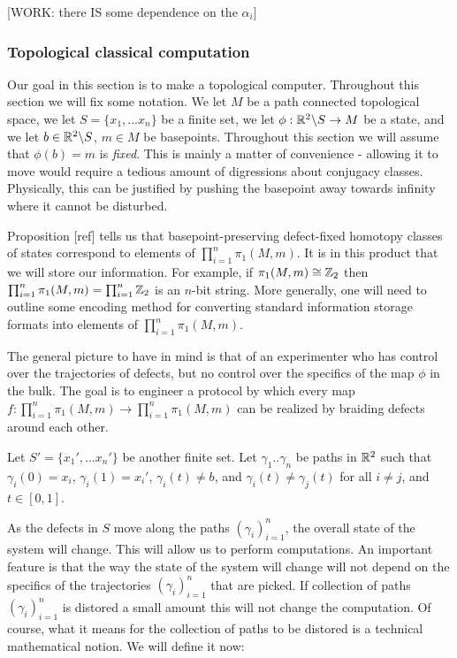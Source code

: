 \documentclass{article}
\theoremstyle{definition}
\numberwithin{figure}{section}
\begin{document}
[WORK: there IS some dependence on the $\alpha_i$]

\subsubsection{Topological classical computation}

Our goal in this section is to make a topological computer. Throughout this section we will fix some notation. We let $M$ be a path connected topological space, we let $S=\{x_1, ...x_n\}$ be a finite set, we let $\phi:\mathbb{R}^2\backslash S\to M$ be a state, and we let $b\in \mathbb{R}^2\backslash S$, $m\in M$ be basepoints. Throughout this section we will assume that $\phi(b)=m$ is \textit{fixed}. This is mainly a matter of convenience - allowing it to move would require a tedious amount of digressions about conjugacy classes. Physically, this can be justified by pushing the basepoint away towards infinity where it cannot be disturbed.

Proposition [ref] tells us that basepoint-preserving defect-fixed homotopy classes of states correspond to elements of $\prod_{i=1}^n\pi_1(M,m)$. It is in this product that we will store our information. For example, if $\pi_1(M,m)\cong \mathbb{Z}_2$ then $\prod_{i=1}^n\pi_1(M,m)=\prod_{i=1}^n\mathbb{Z}_2$ is an $n$-bit string. More generally, one will need to outline some encoding method for converting standard information storage formats into elements of $\prod_{i=1}^n\pi_1(M,m)$.

The general picture to have in mind is that of an experimenter who has control over the trajectories of defects, but no control over the specifics of the map $\phi$ in the bulk. The goal is to engineer a protocol by which every map $f:\prod_{i=1}^n\pi_1(M,m)\to\prod_{i=1}^n\pi_1(M,m)$ can be realized by braiding defects around each other.

Let $S'=\{x_1', ...x_n'\}$ be another finite set. Let $\gamma_1..\gamma_n$ be paths in $\mathbb{R}^2$ such that $\gamma_i(0)=x_i$, $\gamma_i(1)=x_i'$, $\gamma_i(t)\neq b$, and $\gamma_i(t)\neq \gamma_j(t)$ for all $i\neq j$, and $t\in [0,1]$.

As the defects in $S$ move along the paths $(\gamma_i)_{i=1}^n$, the overall state of the system will change. This will allow us to perform computations. An important feature is that the way the state of the system will change will not depend on the specifics of the trajectories $(\gamma_i)_{i=1}^n$ that are picked. If collection of paths $(\gamma_i)_{i=1}^n$ is distored a small amount this will not change the computation. Of course, what it means for the collection of paths to be distored is a technical mathematical notion. We will define it now:
\end{document}
